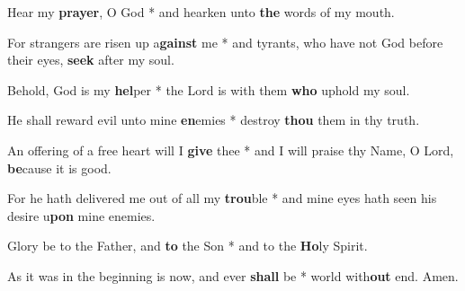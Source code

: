 \begin{multicols}{2}
	Hear my \textbf{prayer}, O God * and hearken unto \textbf{the} words of my mouth.
	
	For strangers are risen up a\textbf{gainst} me * and tyrants, who have not God before their eyes, \textbf{seek} after my soul.
	
	Behold, God is my \textbf{hel}per * the Lord is with them \textbf{who} uphold my soul.
	
	He shall reward evil unto mine \textbf{en}emies * destroy \textbf{thou} them in thy truth.
	
	An offering of a free heart will I \textbf{give} thee * and I will praise thy Name, O Lord, \textbf{be}cause it is good.
	
	For he hath delivered me out of all my \textbf{trou}ble * and mine eyes hath seen his desire u\textbf{pon} mine enemies.
	
	Glory be to the Father, and \textbf{to} the Son * and to the \textbf{Ho}ly Spirit.
	
	As it was in the beginning is now, and ever \textbf{shall} be * world with\textbf{out} end. Amen.
\end{multicols}